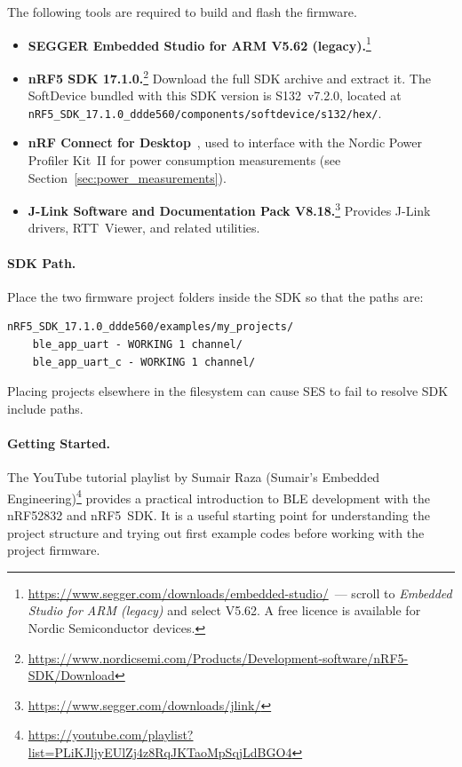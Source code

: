 The following tools are required to build and flash the firmware.

\begin{itemize}
    \item \textbf{SEGGER Embedded Studio for ARM V5.62
    (legacy).}\footnote{\url{https://www.segger.com/downloads/embedded-studio/}~---
    scroll to \textit{Embedded Studio for ARM (legacy)} and select V5.62. A
    free licence is available for Nordic Semiconductor devices.}

    \item \textbf{nRF5 SDK 17.1.0.}\footnote{\url{https://www.nordicsemi.com/Products/Development-software/nRF5-SDK/Download}}
    Download the full SDK archive and extract it. The SoftDevice bundled
    with this SDK version is S132~v7.2.0, located at\\
    \texttt{nRF5\_SDK\_17.1.0\_ddde560/components/softdevice/s132/hex/}.

    \item \textbf{nRF Connect for Desktop}~\cite{nrf_connect_desktop},
    used to interface with the Nordic Power Profiler Kit~II for power
    consumption measurements (see Section~\ref{sec:power_measurements}).

    \item \textbf{J-Link Software and Documentation Pack
    V8.18.}\footnote{\url{https://www.segger.com/downloads/jlink/}}
    Provides J-Link drivers, RTT~Viewer, and related utilities.
\end{itemize}

\paragraph{SDK Path.}
Place the two firmware project folders inside the SDK so that the paths are:
\begin{lstlisting}[basicstyle=\ttfamily\small,breaklines=true,frame=none]
nRF5_SDK_17.1.0_ddde560/examples/my_projects/
    ble_app_uart - WORKING 1 channel/
    ble_app_uart_c - WORKING 1 channel/
\end{lstlisting}
Placing projects elsewhere in the filesystem can cause SES to fail to
resolve SDK include paths.

\paragraph{Getting Started.}
The YouTube tutorial playlist by Sumair Raza (Sumair's Embedded
Engineering)\footnote{\url{https://youtube.com/playlist?list=PLiKJljyEUlZj4z8RqJKTaoMpSqjLdBGO4}}
provides a practical introduction to BLE development with the nRF52832 and
nRF5~SDK. It is a useful starting point for understanding the project
structure and trying out first example codes before working with the project
firmware.

